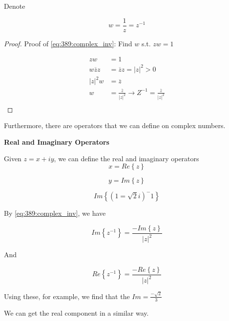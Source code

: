 \documentclass[10pt]{article}
\begin{document}
\begin{definition}
	Denote 

	\begin{equation}
		w = \frac{1}{z} = z^{-1}
		\label{eq:389:complex_inv}
	\end{equation}

	\begin{proof}
		Proof of \eqref{eq:389:complex_inv}:
		Find $ w $ s.t. $ zw = 1 $ 

		\begin{equation}
			\begin{split}
				zw &=1  \\
				 w \overline{z} z&= \overline{z}z = |z|^2 > 0  \\
				 |z|^2 w &= \overline{z}  \\
				 w &= \frac{\overline{z}}{|z|^2} \rightarrow Z^{-1} = \frac{\overline{z}}{|z|^2}\\
			\end{split}
		\end{equation}
		
	\end{proof}

\end{definition}

Furthermore, there are operators that we can define on complex numbers.

\begin{definition}
	\textbf{Real and Imaginary Operators}

	Given $ z = x + iy $, we can define the real and imaginary operators
	\begin{equation}
		x = Re \left\{ z \right\}
	\end{equation}

	\begin{equation}
		y = Im \left\{ z \right\}
	\end{equation}

	\begin{example}
		\begin{equation}
			Im \left\{ (1 = \sqrt{2} i)^-1 \right\} 
		\end{equation}

		By \eqref{eq:389:complex_inv}, we have  


		\begin{equation}
			Im \left\{ z^{-1} \right\} = \frac{-Im \left\{ z \right\} }{|z|^2} 
			\label{eq:389:complex_inv_im}
		\end{equation}

		And

		\begin{equation}
			Re \left\{ z^{-1} \right\} = \frac{-Re \left\{ z \right\} }{|z|^2} 
			\label{eq:389:complex_inv_re}
		\end{equation}

		Using these, for example, we find that the $ Im = \frac{-\sqrt{2} }{3} $

		We can get the real component in a similar way.
		
	\end{example}

\end{definition}
\end{document}
